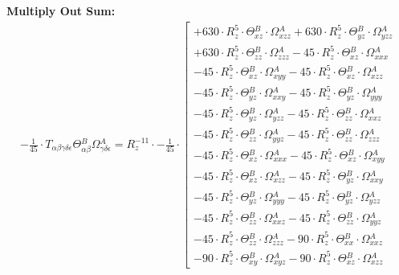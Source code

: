 \documentclass{article}
\begin{document}
\textbf{Multiply Out Sum:}
\begin{subequations}\begin{gather}
- \frac{1}{45} \cdot T_{\alpha{}\beta{}\gamma{}\delta{}\epsilon{}} \Theta{}^{B}_{\alpha{}\beta{}} \Omega{}^{A}_{\gamma{}\delta{}\epsilon{}} = R_{z}^{-11} \cdot - \frac{1}{45} \cdot  \left[ \begin{array}{c} 
 		+ 630 \cdot R_{z}^{5} \cdot \Theta{}^{B}_{xz} \cdot \Omega{}^{A}_{xzz}+ 630 \cdot R_{z}^{5} \cdot \Theta{}^{B}_{yz} \cdot \Omega{}^{A}_{yzz} 
 \\[0.2em] 		 + 630 \cdot R_{z}^{5} \cdot \Theta{}^{B}_{zz} \cdot \Omega{}^{A}_{zzz}- 45 \cdot R_{z}^{5} \cdot \Theta{}^{B}_{xz} \cdot \Omega{}^{A}_{xxx} 
 \\[0.2em] 		 - 45 \cdot R_{z}^{5} \cdot \Theta{}^{B}_{xz} \cdot \Omega{}^{A}_{xyy}- 45 \cdot R_{z}^{5} \cdot \Theta{}^{B}_{xz} \cdot \Omega{}^{A}_{xzz} 
 \\[0.2em] 		 - 45 \cdot R_{z}^{5} \cdot \Theta{}^{B}_{yz} \cdot \Omega{}^{A}_{xxy}- 45 \cdot R_{z}^{5} \cdot \Theta{}^{B}_{yz} \cdot \Omega{}^{A}_{yyy} 
 \\[0.2em] 		 - 45 \cdot R_{z}^{5} \cdot \Theta{}^{B}_{yz} \cdot \Omega{}^{A}_{yzz}- 45 \cdot R_{z}^{5} \cdot \Theta{}^{B}_{zz} \cdot \Omega{}^{A}_{xxz} 
 \\[0.2em] 		 - 45 \cdot R_{z}^{5} \cdot \Theta{}^{B}_{zz} \cdot \Omega{}^{A}_{yyz}- 45 \cdot R_{z}^{5} \cdot \Theta{}^{B}_{zz} \cdot \Omega{}^{A}_{zzz} 
 \\[0.2em] 		 - 45 \cdot R_{z}^{5} \cdot \Theta{}^{B}_{xz} \cdot \Omega{}^{A}_{xxx}- 45 \cdot R_{z}^{5} \cdot \Theta{}^{B}_{xz} \cdot \Omega{}^{A}_{xyy} 
 \\[0.2em] 		 - 45 \cdot R_{z}^{5} \cdot \Theta{}^{B}_{xz} \cdot \Omega{}^{A}_{xzz}- 45 \cdot R_{z}^{5} \cdot \Theta{}^{B}_{yz} \cdot \Omega{}^{A}_{xxy} 
 \\[0.2em] 		 - 45 \cdot R_{z}^{5} \cdot \Theta{}^{B}_{yz} \cdot \Omega{}^{A}_{yyy}- 45 \cdot R_{z}^{5} \cdot \Theta{}^{B}_{yz} \cdot \Omega{}^{A}_{yzz} 
 \\[0.2em] 		 - 45 \cdot R_{z}^{5} \cdot \Theta{}^{B}_{zz} \cdot \Omega{}^{A}_{xxz}- 45 \cdot R_{z}^{5} \cdot \Theta{}^{B}_{zz} \cdot \Omega{}^{A}_{yyz} 
 \\[0.2em] 		 - 45 \cdot R_{z}^{5} \cdot \Theta{}^{B}_{zz} \cdot \Omega{}^{A}_{zzz}- 90 \cdot R_{z}^{5} \cdot \Theta{}^{B}_{xx} \cdot \Omega{}^{A}_{xxz} 
 \\[0.2em] 		 - 90 \cdot R_{z}^{5} \cdot \Theta{}^{B}_{xy} \cdot \Omega{}^{A}_{xyz}- 90 \cdot R_{z}^{5} \cdot \Theta{}^{B}_{xz} \cdot \Omega{}^{A}_{xzz} 

\end{array}
\end{gather}
\end{subequations}
\end{document}
